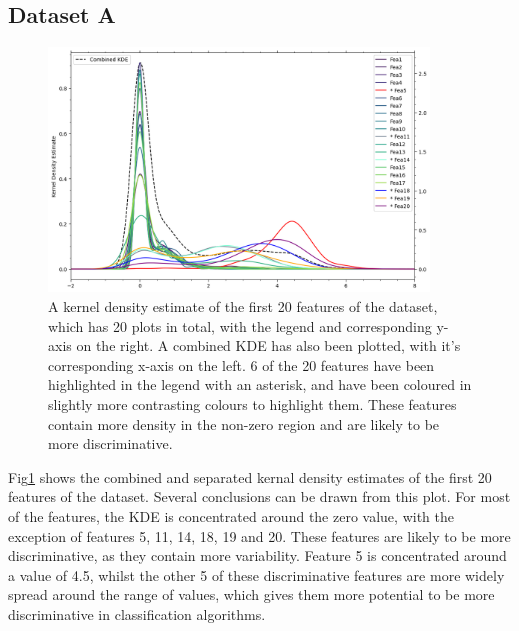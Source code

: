 
\subsection{Dataset A}\label{sec:dataset-a}
    \begin{figure}[htb]
    \centering
    \includegraphics[width=0.9\textwidth]{./figures/q1a}
    \caption{A kernel density estimate of the first 20 features of the dataset, which has 20 plots in total, with the
    legend and corresponding y-axis on the right. A combined KDE has also been plotted, with it's corresponding x-axis
    on the left. 6 of the 20 features have been highlighted in the legend with an asterisk, and have been coloured in
    slightly more contrasting colours to highlight them. These features contain more density in the non-zero region
    and are likely to be more discriminative.}
    \label{fig:q1a}
    \end{figure}

    Fig\ref{fig:q1a} shows the combined and separated kernal density estimates of the first 20 features of the dataset.
    Several conclusions can be drawn from this plot.
    For most of the features, the KDE is concentrated around the zero value, with the exception of features 5, 11, 14,
    18, 19 and 20.
    These features are likely to be more discriminative, as they contain more variability.
    Feature 5 is concentrated around a value of 4.5, whilst the other 5 of these discriminative features are more widely
    spread around the range of values, which gives them more potential to be more discriminative in classification
    algorithms.
